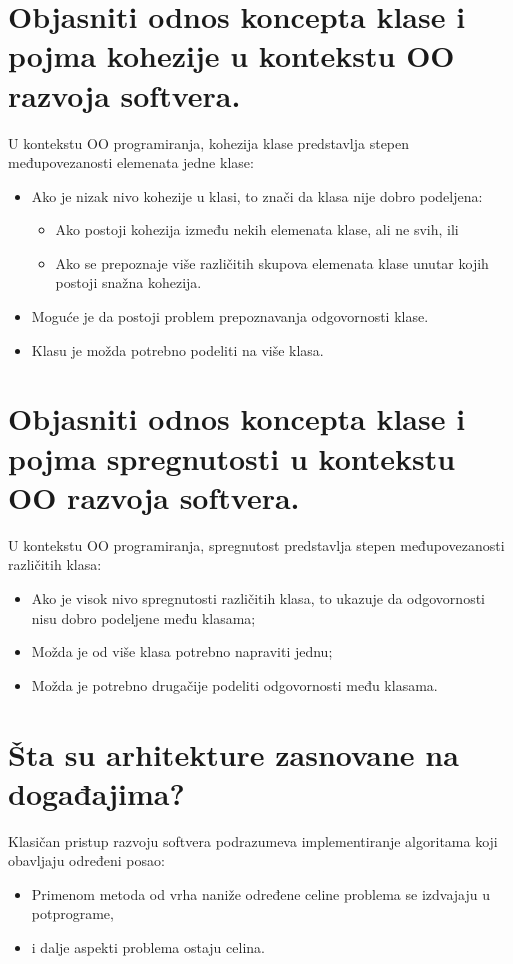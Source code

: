 \documentclass[a4paper]{article}
\begin{document}
\section{Objasniti odnos koncepta klase i pojma kohezije u kontekstu OO razvoja softvera.}
  U kontekstu OO programiranja, kohezija klase predstavlja stepen međupovezanosti elemenata jedne klase:
  \begin{itemize}
    \item Ako je nizak nivo kohezije u klasi, to znači da klasa nije dobro podeljena:
          \begin{itemize}
            \item Ako postoji kohezija između nekih elemenata klase, ali ne svih, ili
            \item Ako se prepoznaje više različitih skupova elemenata klase unutar kojih postoji snažna kohezija.
          \end{itemize}
    \item Moguće je da postoji problem prepoznavanja odgovornosti klase. 
    \item Klasu je možda potrebno podeliti na više klasa.
  \end{itemize}

\section{Objasniti odnos koncepta klase i pojma spregnutosti u kontekstu OO razvoja softvera.}
  U kontekstu OO programiranja, spregnutost predstavlja stepen međupovezanosti različitih klasa:
  \begin{itemize}
    \item Ako je visok nivo spregnutosti različitih klasa, 
          to ukazuje da odgovornosti nisu dobro podeljene među klasama;
    \item Možda je od više klasa potrebno napraviti jednu;
    \item Možda je potrebno drugačije podeliti odgovornosti među klasama.
  \end{itemize}

\section{Šta su arhitekture zasnovane na događajima?}
  Klasičan pristup razvoju softvera podrazumeva implementiranje algoritama 
  koji obavljaju određeni posao:
  \begin{itemize}
    \item Primenom metoda od vrha naniže određene celine problema se izdvajaju u potprograme,
    \item i dalje aspekti problema ostaju celina.
  \end{itemize}
\end{document}

